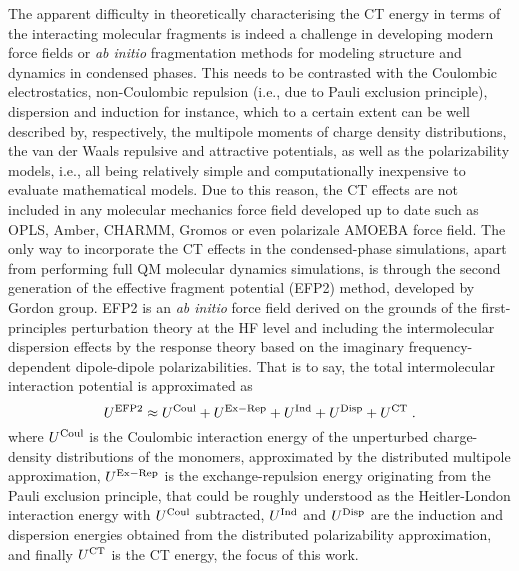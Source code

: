 The apparent difficulty in theoretically characterising the CT energy
in terms of the interacting molecular fragments
is indeed a challenge in developing modern force fields 
or \emph{ab initio} fragmentation methods\cite{Gordon.Fedorov.Pruitt.Slipchenko.ChemRev.2012}
for modeling structure
and dynamics in condensed phases.
This needs to be contrasted with the
Coulombic electrostatics,
non\hyp{}Coulombic repulsion (i.e., due to Pauli exclusion principle), 
dispersion and induction for instance, 
which to a certain extent
can be well described by, respectively, 
the multipole moments of charge density distributions,\cite{Sokalski.Poirier.CPL.1983,
Etchebest.Lavery.Pullman.TheorChimActa.1982,Stone.JCTC.2005}
the van der Waals repulsive and attractive potentials, 
as well as the polarizability models, i.e., all being relatively simple and computationally
inexpensive to evaluate mathematical models. 
Due to this reason, the
CT effects 
are not included in any molecular mechanics force field developed up to date
such as OPLS, Amber, CHARMM, Gromos or even polarizale AMOEBA force field. 
The only way to
incorporate the CT effects in the condensed\hyp{}phase simulations,
apart from performing full QM molecular dynamics simulations,
is through the second generation of the effective fragment potential 
(EFP2) method,\cite{Gordon.Smith.Xu.Slipchenko.AnnuRevPhysChem.2013,
   Nguyen.Pachter.Day.JCP.2014,
   Day.Jensen.Gordon.Webb.Stevens.Krauss.Garmer.Basch.Cohen.JCP.1996}
developed by Gordon group.\cite{Li.Gordon.Jensen.JCP.2006,Xu.Gordon.JCP.2013}
EFP2 is an \emph{ab initio} force field
derived on the grounds of the first\hyp{}principles perturbation theory
at the HF level and including the intermolecular dispersion effects
by the response theory based on the imaginary frequency\hyp{}dependent dipole\hyp{}dipole polarizabilities.
That is to say, the total intermolecular 
interaction potential is approximated as 
%
\begin{equation}\label{e:u-efp2}
 U^{\rm EFP2} \approx U^{\rm Coul} + U^{\rm Ex-Rep} + U^{\rm Ind} + U^{\rm Disp} + U^{\rm CT} \;.
\end{equation}
%
where $U^{\rm Coul}$ is the Coulombic interaction energy of the unperturbed charge\hyp{}density
distributions of the monomers, approximated by the distributed multipole approximation,
$U^{\rm Ex-Rep}$ is the exchange\hyp{}repulsion energy originating from the Pauli exclusion
principle, that could be roughly understood as the Heitler\hyp{}London interaction
energy with $U^{\rm Coul}$ subtracted, $U^{\rm Ind}$ and $U^{\rm Disp}$
are the induction and dispersion energies obtained from the distributed polarizability
approximation, and finally $U^{\rm CT}$ is the CT energy, the focus of this work.

